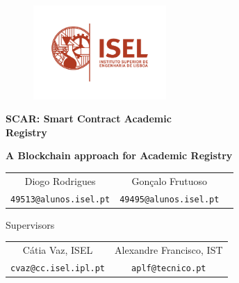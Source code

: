 \documentclass[10pt]{report}
\begin{document}
\thispagestyle{empty}

\begin{figure}[h]
    \includegraphics[width=0.45\textwidth]{assets/logo.png}
\end{figure}

\begin{center}


    \begin{Huge}
        \textbf{SCAR\@: Smart Contract Academic \\ \vspace{.25cm}
            Registry}
    \end{Huge}

    \vspace{.75cm}

    \begin{LARGE}
        \textbf{A Blockchain approach for Academic Registry}
    \end{LARGE}

    \vspace{1cm}

    \vspace{.75cm}
    \begin{large}
        \begin{tabular}{ c c c }
            Diogo Rodrigues               & Gonçalo Frutuoso              \\
            \texttt{49513@alunos.isel.pt} & \texttt{49495@alunos.isel.pt} \\
        \end{tabular}

        \vspace{5.75cm} Supervisors \vspace{0.25cm}

        \begin{tabular}{ c c }
            Cátia Vaz, ISEL              & Alexandre Francisco, IST \\
            \texttt{cvaz@cc.isel.ipl.pt} & \texttt{aplf@tecnico.pt}
        \end{tabular}


\end{large}
\end{center}
\end{document}
